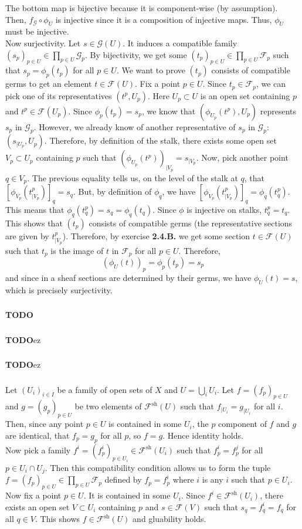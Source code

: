 \documentclass{article}
\newcommand{\sh}{\mathrm{sh}}
\newcommand{\todo}{\textbf{TODO}}
\newcommand{\Fsheaf}{\mathscr{F}}
\newcommand{\Gsheaf}{\mathscr{G}}
\newcommand{\exercise}{\subsubsection} %
\begin{document}
The bottom map is bijective because it is component-wise (by assumption). Then, $f_\Gsheaf \circ \phi_U$ is injective since it is a composition of injective maps. Thus, $\phi_U$ must be injective. \\
Now surjectivity. Let $s \in \Gsheaf(U)$. It induces a compatible family $(s_p)_{p \in U} \in \prod_{p \in U} \Gsheaf_p$. By bijectivity, we get some $(t_p)_{p \in U} \in \prod_{p \in U} \Fsheaf_p$ such that $s_p = \phi_p (t_p)$ for all $p \in U$. We want to prove $(t_p)$ consists of compatible germs to get an element $t \in \Fsheaf(U)$. Fix a point $p \in U$. Since $t_p \in \Fsheaf_p$, we can pick one of its representatives $(t^p, U_p)$. Here $U_p \subset U$ is an open set containing $p$ and $t^p \in \Fsheaf(U_p)$. Since $\phi_p (t_p) = s_p$, we know that $(\phi_{U_p}(t^p),U_p)$ represents $s_p$ in $\Gsheaf_p$. However, we already know of another representative of $s_p$ in $\Gsheaf_p$: $(s_{\mid U_p},U_p)$. Therefore, by definition of the stalk, there exists some open set $V_p \subset U_p$ containing $p$ such that $(\phi_{U_p}(t^p))_{\mid V_p} = s_{\mid V_p}$. Now, pick another point $q \in V_p$. The previous equality tells us, on the level of the stalk at $q$, that $[\phi_{V_p}(t_{\mid V_p}^p)]_q = s_q$. But, by definition of $\phi_q$, we have $[\phi_{V_p}(t_{\mid V_p}^p)]_q = \phi_q (t^p_q)$. This means that $\phi_q(t^p_q) = s_q = \phi_q (t_q)$. Since $\phi$ is injective on stalks, $t^p_q = t_q$. This shows that $(t_p)$ consists of compatible germs (the representative sections are given by $t^p_{\mid V_p}$). Therefore, by exercise \textbf{2.4.B.} we get some section $t \in \Fsheaf(U)$ such that $t_p$ is the image of $t$ in $\Fsheaf_p$ for all $p \in U$. Therefore,
\[(\phi_U (t))_p = \phi_p (t_p) = s_p \]
and since in a sheaf sections are determined by their germs, we have $\phi_U(t) = s$, which is precisely surjectivity.

\exercise{} \todo

\exercise{} \todo ez

\exercise{} \todo ez

\exercise{} Let $(U_i)_{i\in I}$ be a family of open sets of $X$ and $U = \bigcup_i U_i$. Let $f = (f_p)_{p\in U}$ and $g = (g_p)_{p \in U}$ be two elements of $\Fsheaf^\sh(U)$ such that $f_{\mid U_i} = g_{\mid U_i}$ for all $i$. Then, since any point $p \in U$ is contained in some $U_i$, the $p$ component of $f$ and $g$ are identical, that $f_p = g_p$ for all $p$, so $f=g$. Hence identity holds. \\
Now pick a family $f^i = (f^i_p)_{p \in U_i} \in \Fsheaf^\sh(U_i)$ such that $f^i_p = f^j_p$ for all $p \in U_i \cap U_j$. Then this compatibility condition allows us to form the tuple $f = (f_p)_{p \in U} \in \prod_{p \in U} \Fsheaf_p$ defined by $f_p = f^i_p$ where $i$ is any $i$ such that $p \in U_i$. Now fix a point $p \in U$. It is contained in some $U_i$. Since $f^i \in \Fsheaf^\sh(U_i)$, there exists an open set $V \subset U_i$ containing $p$ and $s \in \Fsheaf(V)$ such that $s_q = f_q^i = f_q$ for all $q \in V$. This shows $f \in \Fsheaf^\sh (U)$ and gluability holds.
\end{document}

